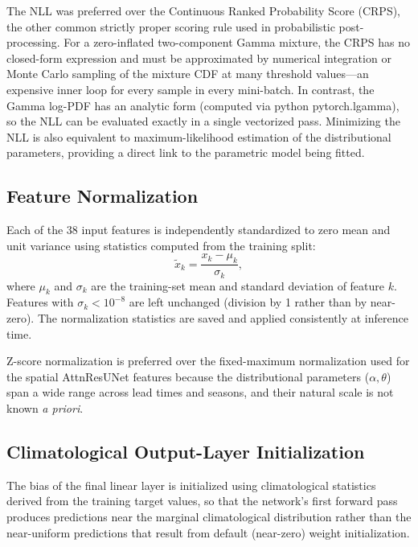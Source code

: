 \documentclass[11pt]{article}
\begin{document}
The NLL was preferred over the Continuous Ranked Probability Score (CRPS),
the other common strictly proper scoring rule used in probabilistic
post-processing.  For a zero-inflated two-component Gamma mixture, the CRPS
has no closed-form expression and must be approximated by numerical integration
or Monte Carlo sampling of the mixture CDF at many threshold values---an
expensive inner loop for every sample in every mini-batch.  In contrast, the
Gamma log-PDF has an analytic form (computed via python pytorch.lgamma), so the
NLL can be evaluated exactly in a single vectorized pass.  Minimizing the NLL
is also equivalent to maximum-likelihood estimation of the distributional
parameters, providing a direct link to the parametric model being fitted.

\subsection{Feature Normalization}
\label{sec:normalization}

Each of the 38 input features is independently standardized to zero mean
and unit variance using statistics computed from the training split:
\begin{equation}
  \tilde{x}_k = \frac{x_k - \mu_k}{\sigma_k},
  \label{eq:zscore}
\end{equation}
where $\mu_k$ and $\sigma_k$ are the training-set mean and standard deviation
of feature $k$.  Features with $\sigma_k < 10^{-8}$ are left unchanged
(division by 1 rather than by near-zero).  The normalization statistics
are saved and applied consistently at inference time.

Z-score normalization is preferred over the fixed-maximum normalization used
for the spatial AttnResUNet features because the distributional parameters
($\alpha, \theta$) span a wide range across lead times and seasons, and their
natural scale is not known \textit{a priori}.

\subsection{Climatological Output-Layer Initialization}
\label{sec:initialization}

The bias of the final linear layer is initialized using climatological
statistics derived from the training target values, so that the network's
first forward pass produces predictions near the marginal climatological
distribution rather than the near-uniform predictions that result from default
(near-zero) weight initialization.
\end{document}

